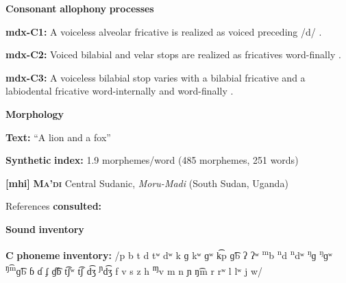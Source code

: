\begin{styleBody}
\textbf{Consonant} \textbf{allophony} \textbf{processes}
\end{styleBody}

\begin{styleBody}
\textbf{mdx-C1:} A voiceless alveolar fricative is realized as voiced preceding /d/ \citep[26]{Beachy2005}.
\end{styleBody}

\begin{styleBody}
\textbf{mdx-C2:} Voiced bilabial and velar stops are realized as fricatives word-finally \citep[17]{Beachy2005}.
\end{styleBody}

\begin{styleBody}
\textbf{mdx-C3:} A voiceless bilabial stop varies with a bilabial fricative and a labiodental fricative word-internally and word-finally \citep[17]{Beachy2005}.
\end{styleBody}

\begin{styleBody}
\textbf{Morphology}
\end{styleBody}

\begin{styleBody}
\textbf{Text:} “A lion and a fox” \citep[154-158]{Beachy2005}
\end{styleBody}

\begin{styleBody}
\textbf{Synthetic} \textbf{index:} 1.9 morphemes/word (485 morphemes, 251 words)
\end{styleBody}

\begin{styleBody}
\textbf{[mhi]}   \textbf{\textsc{Ma’di}}  Central Sudanic, \textit{Moru-Madi} (South Sudan, Uganda)
\end{styleBody}

\begin{styleBody}
References \textbf{consulted:} \citet{BlackingsFabb2003}
\end{styleBody}

\begin{styleBody}
\textbf{Sound} \textbf{inventory}
\end{styleBody}

\begin{styleBody}
\textbf{C} \textbf{phoneme} \textbf{inventory:} /p b t d tʷ dʷ k ɡ kʷ ɡʷ k͡p ɡ͡b ʔ ʔʷ \textsuperscript{m}b \textsuperscript{n}d \textsuperscript{n}dʷ \textsuperscript{ŋ}ɡ \textsuperscript{ŋ}ɡʷ \textsuperscript{ŋ͡m}ɡ͡b ɓ ɗ ʄ ɠ͡ɓ t͡ʃʷ t͡ʃ d͡ʒ \textsuperscript{ɲ}d͡ʒ f v s z h \textsuperscript{ɱ}v m n ɲ ŋ͡m r rʷ l lʷ j w/
\end{styleBody}

